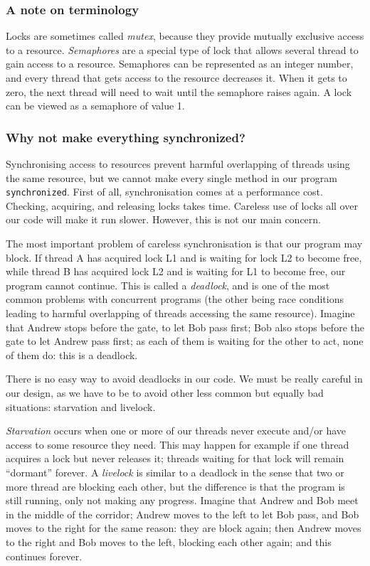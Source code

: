 \subsubsection*{A note on terminology}
\label{sec:note-terminology}

Locks are sometimes called \emph{mutex}, because they provide mutually
exclusive access to a resource. \emph{Semaphores} are a special type
of lock that allows several thread to gain access to a
resource. Semaphores can be represented as an integer number, and
every thread that gets access to the resource decreases it. When it
gets to zero, the next thread will need to wait until the semaphore
raises again. A lock can be viewed as a semaphore of value 1. 

\subsubsection{Why not make everything synchronized?}
\label{sec:why-not-make}

Synchronising access to resources prevent harmful overlapping of
threads using the same resource, but we cannot make every single
method in our program \verb+synchronized+. First of all,
synchronisation comes at a performance cost. Checking, acquiring, and
releasing locks takes time. Careless use of locks all over our code
will make it run slower. However, this is not our main concern. 

The most important problem of careless synchronisation is that our
program may block. If thread A has acquired lock L1 and is waiting for
lock L2 to become free, while thread B has acquired lock L2 and is
waiting for L1 to become free, our program cannot continue. This is
called a \emph{deadlock}, and is one of the most common problems with
concurrent programs (the other being race conditions leading
to harmful overlapping of threads accessing the same resource). 
%
Imagine that Andrew stops before the gate, to let Bob pass first; Bob
also stops before the gate to let Andrew pass first; as each of them
is waiting for the other to act, none of them do: this is a deadlock. 

There is no easy way to avoid deadlocks in our code. We must be really
careful in our design, as we have to be to avoid other less common but
equally bad situations: starvation and livelock. 

\emph{Starvation} occurs when one or more of our threads never execute
and/or have access to some resource they need. This may happen for
example if one thread acquires a lock but never releases it; threads
waiting for that lock will remain ``dormant'' forever.
%
A \emph{livelock} is similar to a deadlock in the sense that two or
more thread are blocking each other, but the difference is that the
program is still running, only not making any progress. Imagine that
Andrew and Bob meet in the middle of the corridor; Andrew moves to the
left to let Bob pass, and Bob moves to the right for the same reason:
they are block again; then Andrew moves to the right and Bob moves to
the left, blocking each other again; and this continues forever. 

